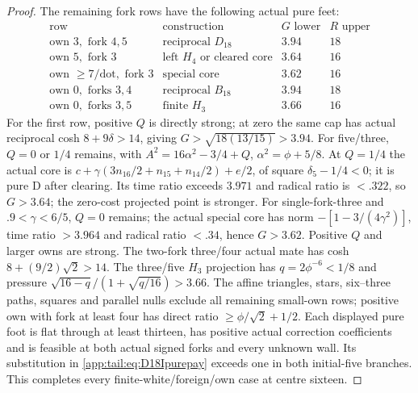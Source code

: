 \documentclass[11pt]{article}
\theoremstyle{definition}
\theoremstyle{remark}
\begin{document}
\begin{proof}
The remaining fork rows have the following actual pure feet:
\[
\begin{array}{c|c|cc}
\text{row}&\text{construction}&G\text{ lower}&R\text{ upper}\\\hline
\text{own }3,\text{ fork }4,5&\text{reciprocal }D_{18}&3.94&18\\
\text{own }5,\text{ fork }3&\text{left }H_4\text{ or cleared core}&3.64&16\\
\text{own }\ge7/\text{dot},\text{ fork }3&\text{special core}&3.62&16\\
\text{own }0,\text{ forks }3,4&\text{reciprocal }B_{18}&3.94&18\\
\text{own }0,\text{ forks }3,5&\text{finite }H_3&3.66&16
\end{array}
\]
For the first row, positive $Q$ is directly strong; at zero
the same cap has actual reciprocal cosh $8+9\delta>14$,
giving $G>\sqrt{18(13/15)}>3.94$.
For five/three, $Q=0$ or $1/4$ remains, with
$A^2=16\alpha^2-3/4+Q$, $\alpha^2=\phi+5/8$.
At $Q=1/4$ the actual core is
$c+\gamma(3n_{16}/2+n_{15}+n_{14}/2)+e/2$,
of square $\delta_5-1/4<0$; it is pure D after clearing.
Its time ratio exceeds $3.971$ and radical ratio is $<.322$,
so $G>3.64$; the zero-cost projected point is stronger.
For single-fork-three and $.9<\gamma<6/5$, $Q=0$ remains;
the actual special core has norm $-[1-3/(4\gamma^2)]$,
time ratio $>3.964$ and radical ratio $<.34$, hence $G>3.62$.
Positive $Q$ and larger owns are strong.
The two-fork three/four actual mate has cosh
$8+(9/2)\sqrt2>14$. The three/five $H_3$ projection has
$q=2\phi^{-6}<1/8$ and pressure
$\sqrt{16-q}/(1+\sqrt{q/16})>3.66$.
The affine triangles, stars, six--three paths, squares and
parallel nulls exclude all remaining small-own rows; positive
own with fork at least four has direct ratio
$\ge\phi/\sqrt2+1/2$.
Each displayed pure foot is flat through at least thirteen,
has positive actual correction coefficients and is feasible
at both actual signed forks and every unknown wall.
Its substitution in \eqref{app:tail:eq:D18Ipurepay} exceeds
one in both initial-five branches. This completes every
finite-white/foreign/own case at centre sixteen.


\end{proof}
\end{document}

